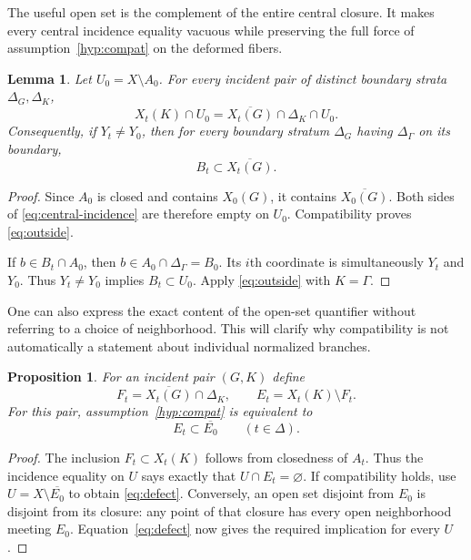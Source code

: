\documentclass[11pt]{article}
\newcommand{\cl}[1]{\overline{#1}}
\newtheorem{proposition}[theorem]{Proposition}
\newtheorem{lemma}[theorem]{Lemma}
\theoremstyle{definition}
\theoremstyle{remark}
\begin{document}
The useful open set is the complement of the entire central closure. It makes every central incidence equality vacuous while preserving the full force of assumption~\ref{hyp:compat} on the deformed fibers.

\begin{lemma}\label{lem:outside}
Let $U_0=X\setminus A_0$. For every incident pair of distinct boundary strata $\Delta_G,\Delta_K$,
\begin{equation}\label{eq:outside}
 X_t(K)\cap U_0=\cl{X_t(G)}\cap\Delta_K\cap U_0.
\end{equation}
Consequently, if $Y_t\ne Y_0$, then for every boundary stratum $\Delta_G$ having $\Delta_\Gamma$ on its boundary,
\begin{equation}\label{eq:moving}
 B_t\subset\cl{X_t(G)}.
\end{equation}
\end{lemma}

\begin{proof}
Since $A_0$ is closed and contains $X_0(G)$, it contains $\cl{X_0(G)}$. Both sides of \eqref{eq:central-incidence} are therefore empty on $U_0$. Compatibility proves \eqref{eq:outside}.

If $b\in B_t\cap A_0$, then $b\in A_0\cap\Delta_\Gamma=B_0$. Its $i$th coordinate is simultaneously $Y_t$ and $Y_0$. Thus $Y_t\ne Y_0$ implies $B_t\subset U_0$. Apply \eqref{eq:outside} with $K=\Gamma$.
\end{proof}

One can also express the exact content of the open-set quantifier without referring to a choice of neighborhood. This will clarify why compatibility is not automatically a statement about individual normalized branches.

\begin{proposition}\label{prop:defect}
For an incident pair $(G,K)$ define
\[
 F_t=\cl{X_t(G)}\cap\Delta_K,\qquad
 E_t=X_t(K)\setminus F_t.
\]
For this pair, assumption~\ref{hyp:compat} is equivalent to
\begin{equation}\label{eq:defect}
 E_t\subset\cl{E_0}\qquad(t\in\Delta).
\end{equation}
\end{proposition}

\begin{proof}
The inclusion $F_t\subset X_t(K)$ follows from closedness of $A_t$. Thus the incidence equality on $U$ says exactly that $U\cap E_t=\varnothing$. If compatibility holds, use $U=X\setminus\cl{E_0}$ to obtain \eqref{eq:defect}. Conversely, an open set disjoint from $E_0$ is disjoint from its closure: any point of that closure has every open neighborhood meeting $E_0$. Equation~\eqref{eq:defect} now gives the required implication for every $U$.
\end{proof}
\end{document}
